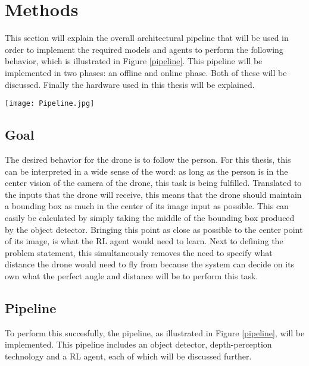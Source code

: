 \section{Methods}
This section will explain the overall architectural pipeline that will be used in 
order to implement the required models and agents to perform the following behavior,
which is illustrated in Figure \ref{pipeline}. This pipeline will be implemented 
in two phases: an offline and online phase. Both of these will be discussed. 
Finally the hardware used in this thesis will be explained.

\begin{Figure}
    \centering
    \texttt{[image: Pipeline.jpg]}
    \label{pipeline}
\end{Figure}

\subsection{Goal}
The desired behavior for the drone is to follow the person. For this thesis, 
this can be interpreted in a wide sense of the word: as long as the person 
is in the center vision of the camera of the drone, this task is being
fulfilled. Translated to the inputs that the drone will receive, this 
means that the drone should maintain a bounding box as much 
in the center of its image input as possible. This can easily be 
calculated by simply taking the middle of the bounding box produced by the 
object detector. Bringing this point as close as possible to the center 
point of its image, is what the RL agent would need to learn. Next to 
defining the problem statement, this simultaneously 
removes the need to specify what distance the drone would need to fly from 
because the system can decide on its own what the perfect angle and distance 
will be to perform this task. 

\subsection{Pipeline}
To perform this succesfully, the pipeline, as illustrated in Figure \ref{pipeline}, 
will be implemented. This pipeline includes an object detector, 
depth-perception technology and a RL agent, each of which will be discussed 
further.

